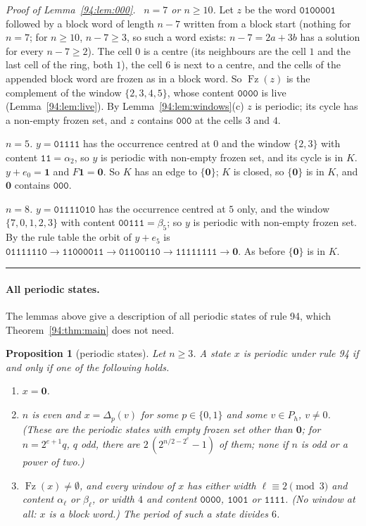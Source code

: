 \documentclass[10pt,a4paper]{article}
\newtheorem{proposition}[theorem]{Proposition}
\newcommand{\qedmark}{\rule{1.1ex}{1.1ex}}
\newenvironment{proof}[1][Proof]{\par\smallskip\noindent\textit{#1.}\ }{\hfill\qedmark\par\smallskip}
\newcommand{\zero}{\mathbf{0}}                %
\newcommand{\one}{\mathbf{1}}                 %
\newcommand{\code}[1]{\mathtt{#1}}            %
\newcommand{\Fz}{\operatorname{Fz}}           %
\begin{document}
\begin{proof}[Proof of Lemma~\ref{94:lem:000}]
\emph{$n=7$ or $n\ge10$.} Let $z$ be the word $\code{0100001}$ followed by a block word of length $n-7$ written
from a block start (nothing for $n=7$; for $n\ge10$, $n-7\ge3$, so such a word exists: $n-7=2a+3b$ has a solution
for every $n-7\ge2$). The cell $0$ is a centre (its neighbours are the cell $1$ and the last cell of the ring,
both $1$), the cell $6$ is next to a centre, and the cells of the appended block word are frozen as in a block
word. So $\Fz(z)$ is the complement of the window $\{2,3,4,5\}$, whose content $\code{0000}$ is live
(Lemma~\ref{94:lem:live}). By Lemma~\ref{94:lem:windows}(c) $z$ is periodic; its cycle has a non-empty frozen set,
and $z$ contains $\code{000}$ at the cells $3$ and $4$.

\emph{$n=5$.} $y=\code{01111}$ has the occurrence centred at $0$ and the window $\{2,3\}$ with content
$\code{11}=\alpha_2$, so $y$ is periodic with non-empty frozen set, and its cycle is in $K$. $y+e_0=\one$ and
$F\one=\zero$. So $K$ has an edge to $\{\zero\}$; $K$ is closed, so $\{\zero\}$ is in $K$, and $\zero$ contains
$\code{000}$.

\emph{$n=8$.} $y=\code{01111010}$ has the occurrence centred at $5$ only, and the window $\{7,0,1,2,3\}$ with
content $\code{00111}=\beta_5$; so $y$ is periodic with non-empty frozen set. By the rule table the orbit of
$y+e_5$ is $\code{01111110}\to\code{11000011}\to\code{01100110}\to\code{11111111}\to\zero$. As before
$\{\zero\}$ is in $K$.
\end{proof}

\paragraph{All periodic states.}
The lemmas above give a description of all periodic states of rule 94, which Theorem~\ref{94:thm:main} does not
need.

\begin{proposition}[periodic states]\label{94:prop:periodic}
Let $n\ge3$. A state $x$ is periodic under rule 94 if and only if one of the following holds.
\begin{enumerate}[label=\arabic*.,leftmargin=*,nosep]
\item $x=\zero$.
\item $n$ is even and $x=\Delta_p(v)$ for some $p\in\{0,1\}$ and some $v\in P_h$, $v\ne0$. (These are the periodic
states with empty frozen set other than $\zero$; for $n=2^{e+1}q$, $q$ odd, there are $2\,(2^{n/2-2^e}-1)$ of
them; none if $n$ is odd or a power of two.)
\item $\Fz(x)\ne\emptyset$, and every window of $x$ has either width $\ell\equiv2\pmod3$ and content $\alpha_\ell$
or $\beta_\ell$, or width $4$ and content $\code{0000}$, $\code{1001}$ or $\code{1111}$. (No window at all: $x$ is
a block word.) The period of such a state divides $6$.
\end{enumerate}
\end{proposition}
\end{document}
